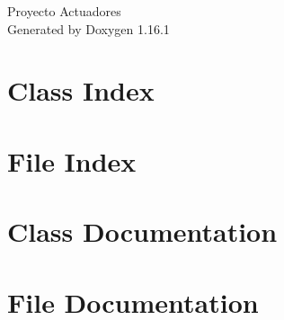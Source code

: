 \documentclass[twoside]{book}
\newcommand{\+}{\discretionary{\mbox{\scriptsize$\hookleftarrow$}}{}{}}
\newcommand{\clearemptydoublepage}{%
    \newpage{\pagestyle{empty}\cleardoublepage}%
  }
\begin{document}
  \raggedbottom
    \hypersetup{pageanchor=false,
                bookmarksnumbered=true,
                pdfencoding=unicode
               }
  \begin{titlepage}
  \vspace*{7cm}
  \begin{center}%
  {\Large Proyecto Actuadores}\\
  \vspace*{1cm}
  {\large Generated by Doxygen 1.16.1}\\
  \end{center}
  \end{titlepage}
  \clearemptydoublepage
  \tableofcontents
  \clearemptydoublepage
  \hypersetup{pageanchor=true}
\chapter{Class Index}

\chapter{File Index}

\chapter{Class Documentation}

\chapter{File Documentation}

  \backmatter
  \newpage
  \clearemptydoublepage
  \printindex
\end{document}
